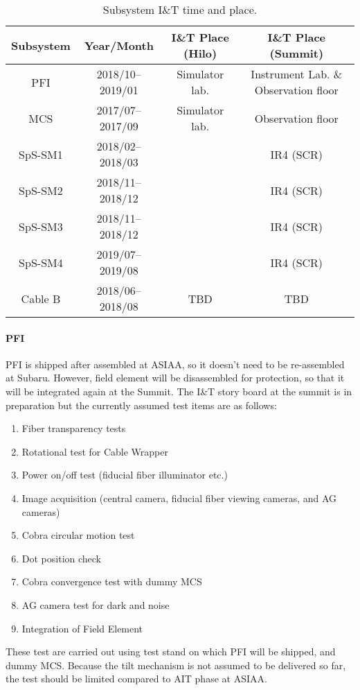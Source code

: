 \begin{table}[!ht]
\begin{center}
\caption{Subsystem I\&T time and place.}
\label{tbl:SubSysIandT} 
\begin{tabular}{*{4}{c}} \hline
Subsystem	& Year/Month & I\&T Place (Hilo) & I\&T Place (Summit) \\ \hline \hline
PFI	& 2018/10--2019/01		& Simulator lab.	& Instrument Lab. \& Observation floor \\
MCS	& 2017/07--2017/09	& Simulator lab.	& Observation floor \\
SpS-SM1	& 2018/02--2018/03		& & IR4 (SCR) \\
SpS-SM2	& 2018/11--2018/12		& & IR4 (SCR) \\
SpS-SM3	& 2018/11--2018/12		& & IR4 (SCR) \\
SpS-SM4	& 2019/07--2019/08		& & IR4 (SCR) \\
Cable B	&	2018/06--2018/08	& TBD	&TBD \\ \hline
\end{tabular} 
\end{center}
\end{table}

\paragraph{PFI}
PFI is shipped after assembled at ASIAA, so it doesn't need to be re-assembled at Subaru.
However, field element will be disassembled for protection, so that it will be integrated again at the Summit.
The I\&T story board at the summit is in preparation but the currently assumed test items are as follows:
\begin{enumerate}
\item Fiber transparency tests
\item Rotational test for Cable Wrapper
\item Power on/off test (fiducial fiber illuminator etc.)
\item Image acquisition (central camera, fiducial fiber viewing cameras, and AG cameras)
\item Cobra circular motion test
\item Dot position check
\item Cobra convergence test with dummy MCS
\item AG camera test for dark and noise
\item Integration of Field Element
\end{enumerate}
These test are carried out using test stand on which PFI will be shipped, and dummy MCS.
Because the tilt mechanism is not assumed to be delivered so far, the test should be limited compared to AIT phase at ASIAA.

